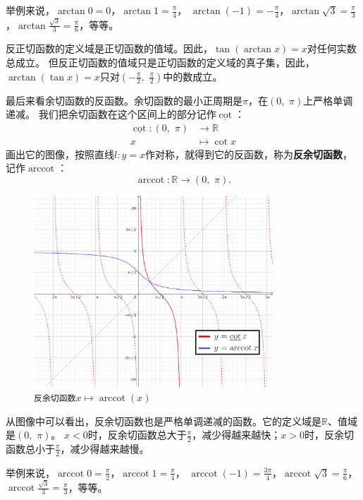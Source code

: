 \documentclass[12pt,UTF8]{ctexbook}
\newcommand{\arccot}{\operatorname{arccot}}
\begin{document}
举例来说，$\arctan{0} = 0$，$\arctan{1} = \frac{\pi}{4}$，
$\arctan{(-1)} = -\frac{\pi}{4}$，$\arctan{\sqrt{3}} = \frac{\pi}{3}$，$\arctan{\frac{\sqrt{3}}{3}} = \frac{\pi}{6}$，等等。

反正切函数的定义域是正切函数的值域。因此，$\tan{(\arctan{x})} = x$对任何实数总成立。
但反正切函数的值域只是正切函数的定义域的真子集，因此，$\arctan{(\tan{x})} = x$只对$(-\frac{\pi}{2}, \,\, \frac{\pi}{2})$中的数成立。

最后来看余切函数的反函数。余切函数的最小正周期是$\pi$，在$(0, \,\, \pi)$上严格单调递减。
我们把余切函数在这个区间上的部分记作$\underline{\cot}$：
\begin{align*}
    \underline{\cot} : (0, \,\, \pi) &\rightarrow \mathbb{R}  \\
                                   x &\mapsto \cot{x} 
\end{align*}
画出它的图像，按照直线$l: y = x$作对称，就得到它的反函数，称为\textbf{反余切函数}，记作$\arccot$：
$$ \arccot : \mathbb{R} \rightarrow (0, \,\, \pi) . $$

\begin{figure}[h] %
    \vspace{4pt}
    \centering
    \includegraphics[width=0.8\textwidth]{tu/反余切函数1.png}
    \caption*{\texttt{反余切函数}$x\mapsto \arccot(x)$}
\end{figure}

从图像中可以看出，反余切函数也是严格单调递减的函数。它的定义域是$\mathbb{R}$、值域是$(0, \,\, \pi)$。
$x < 0$时，反余切函数总大于$\frac{\pi}{2}$，减少得越来越快；$x > 0$时，反余切函数总小于$\frac{\pi}{2}$，减少得越来越慢。

举例来说，$\arccot{0} = \frac{\pi}{2}$，$\arccot{1} = \frac{\pi}{4}$，
$\arccot{(-1)} = \frac{3\pi}{4}$，$\arccot{\sqrt{3}} = \frac{\pi}{6}$，$\arccot{\frac{\sqrt{3}}{3}} = \frac{\pi}{3}$，等等。
\end{document}
